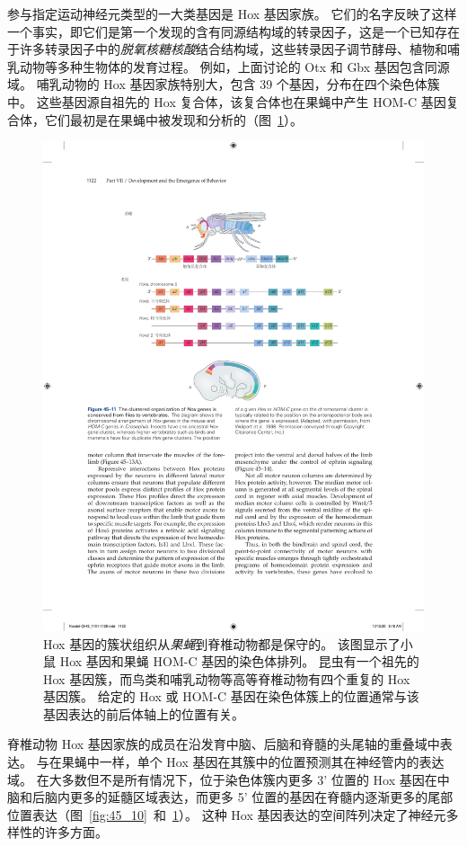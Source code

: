 参与指定运动神经元类型的一大类基因是 Hox 基因家族。
它们的名字反映了这样一个事实，即它们是第一个发现的含有同源结构域的转录因子，这是一个已知存在于许多转录因子中的\textit{脱氧核糖核酸}结合结构域，这些转录因子调节酵母、植物和哺乳动物等多种生物体的发育过程。
例如，上面讨论的 Otx 和 Gbx 基因包含同源域。
哺乳动物的 Hox 基因家族特别大，包含 39 个基因，分布在四个染色体簇中。
这些基因源自祖先的 Hox 复合体，该复合体也在果蝇中产生 HOM-C 基因复合体，它们最初是在果蝇中被发现和分析的（图~\ref{fig:45_11}）。


\begin{figure}[htbp]
	\centering
	\includegraphics[width=0.95\linewidth]{chap45/fig_45_11}
	\caption{Hox 基因的簇状组织从\textit{果蝇}到脊椎动物都是保守的。
		该图显示了小鼠 Hox 基因和果蝇 HOM-C 基因的染色体排列。
		昆虫有一个祖先的 Hox 基因簇，而鸟类和哺乳动物等高等脊椎动物有四个重复的 Hox 基因簇。
		给定的 Hox 或 HOM-C 基因在染色体簇上的位置通常与该基因表达的前后体轴上的位置有关\cite{wolpert2015principles}。 }
	\label{fig:45_11}
\end{figure}


脊椎动物 Hox 基因家族的成员在沿发育中脑、后脑和脊髓的头尾轴的重叠域中表达。
与在果蝇中一样，单个 Hox 基因在其簇中的位置预测其在神经管内的表达域。
在大多数但不是所有情况下，位于染色体簇内更多 3' 位置的 Hox 基因在中脑和后脑内更多的延髓区域表达，而更多 5' 位置的基因在脊髓内逐渐更多的尾部位置表达（图~\ref{fig:45_10}~和~\ref{fig:45_11}）。
这种 Hox 基因表达的空间阵列决定了神经元多样性的许多方面。


